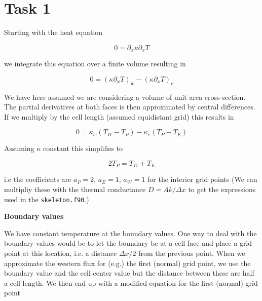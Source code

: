 \documentclass{article}
\begin{document}

\section{Task 1}

Starting with the heat equation

\begin{equation}
0 = \partial_x \kappa \partial_x T
\end{equation}

we integrate this equation over a finite volume resulting in

\begin{equation}
\label{eq:fvm_exact}
0 = (\kappa \partial_x T)_w - (\kappa \partial_x T)_e
\end{equation}

We have here assumed we are considering a volume of unit area cross-section. The partial derivatives at both faces is then approximated by central differences. If we multiply by the cell length (assumed equidistant grid) this results in

\begin{equation}
0 = \kappa_w ( T_W - T_P ) - \kappa_e ( T_P - T_E )
\end{equation}

Assuming $\kappa$ constant this simplifies to

\begin{equation}
2 T_P  =  T_W +  T_E  
\end{equation}

i.e the coefficients are $a_P = 2$, $a_E = 1 $, $a_W = 1 $ for the interior grid points (We can multipliy these with the thermal conductance $D = Ak/\Delta x$ to get the expressions used in the \texttt{skeleton.f90}.)

\textbf{Boundary values}

We have constant temperature at the boundary values. One way to deal with the boundary values would be to let the boundary be at a cell face and place a grid point at this location, i.e. a distance $\Delta x/2$ from the previous point. When we approximate the western flux for (e.g.) the first (normal) grid point, we use the boundary value and the cell center value but the distance between these are half a cell length. We then end up with a modified equation for the first (normal) grid point
\end{document}
